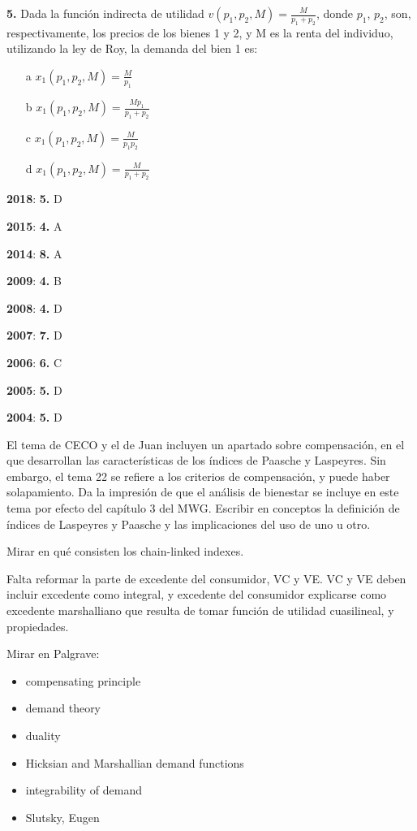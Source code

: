 \documentclass{nuevotema}
\begin{document}
\textbf{5.} Dada la función indirecta de utilidad $v(p_1, p_2, M) = \frac{M}{p_1+p_2}$, donde $p_1$, $p_2$, son, respectivamente, los precios de los bienes 1 y 2, y M es la renta del individuo, utilizando la ley de Roy, la demanda del bien 1 es:
\begin{enumerate}
	\item[a] $x_1(p_1, p_2, M) = \frac{M}{p_1}$
	\item[b] $x_1(p_1, p_2, M) = \frac{Mp_1}{p_1+p_2}$
	\item[c] $x_1(p_1, p_2, M) = \frac{M}{p_1 p_2}$
	\item[d] $x_1(p_1, p_2, M) = \frac{M}{p_1 + p_2}$
\end{enumerate}

\notas

\textbf{2018}: \textbf{5.} D

\textbf{2015}: \textbf{4.} A

\textbf{2014}: \textbf{8.} A

\textbf{2009}: \textbf{4.} B

\textbf{2008}: \textbf{4.} D

\textbf{2007}: \textbf{7.} D

\textbf{2006}: \textbf{6.} C

\textbf{2005}: \textbf{5.} D

\textbf{2004}: \textbf{5.} D

El tema de CECO y el de Juan incluyen un apartado sobre compensación, en el que desarrollan las características de los índices de Paasche y Laspeyres. Sin embargo, el tema 22 se refiere a los criterios de compensación, y puede haber solapamiento. Da la impresión de que el análisis de bienestar se incluye en este tema por efecto del capítulo 3 del MWG. Escribir en conceptos la definición de índices de Laspeyres y Paasche y las implicaciones del uso de uno u otro.

Mirar en qué consisten los chain-linked indexes.

Falta reformar la parte de excedente del consumidor, VC y VE. VC y VE deben incluir excedente como integral, y excedente del consumidor explicarse como excedente marshalliano que resulta de tomar función de utilidad cuasilineal, y propiedades.

\bibliografia

Mirar en Palgrave:
\begin{itemize}
	\item compensating principle
	\item demand theory
	\item duality
	\item Hicksian and Marshallian demand functions
	\item integrability of demand
	\item Slutsky, Eugen
\end{itemize}
\end{document}
